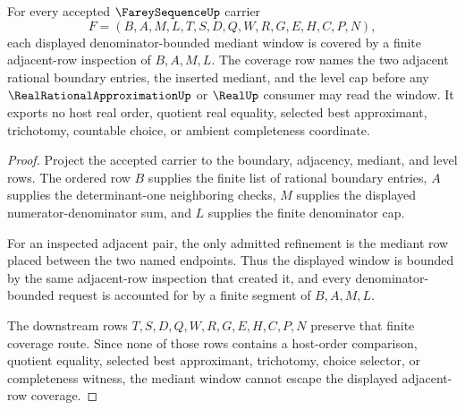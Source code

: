 \begin{theorem}
\label{thm:farey-sequence-mediant-window-coverage}
For every accepted $\FareySequenceUp$ carrier
$$
F=(B,A,M,L,T,S,D,Q,W,R,G,E,H,C,P,N),
$$
each displayed denominator-bounded mediant window is covered by a finite adjacent-row inspection of $B,A,M,L$. The coverage row names the two adjacent rational boundary entries, the inserted mediant, and the level cap before any $\RealRationalApproximationUp$ or $\RealUp$ consumer may read the window. It exports no host real order, quotient real equality, selected best approximant, trichotomy, countable choice, or ambient completeness coordinate.
\end{theorem}
\begin{proof}
Project the accepted carrier to the boundary, adjacency, mediant, and level rows. The ordered row $B$ supplies the finite list of rational boundary entries, $A$ supplies the determinant-one neighboring checks, $M$ supplies the displayed numerator-denominator sum, and $L$ supplies the finite denominator cap.

For an inspected adjacent pair, the only admitted refinement is the mediant row placed between the two named endpoints. Thus the displayed window is bounded by the same adjacent-row inspection that created it, and every denominator-bounded request is accounted for by a finite segment of $B,A,M,L$.

The downstream rows $T,S,D,Q,W,R,G,E,H,C,P,N$ preserve that finite coverage route. Since none of those rows contains a host-order comparison, quotient equality, selected best approximant, trichotomy, choice selector, or completeness witness, the mediant window cannot escape the displayed adjacent-row coverage.
\end{proof}

